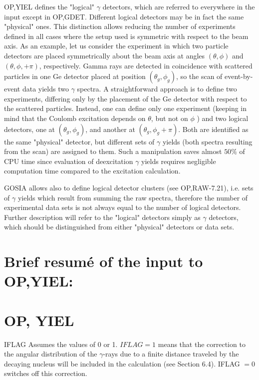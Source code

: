 \documentclass[10pt]{article}
\begin{document}
OP,YIEL defines the "logical" $\gamma$ detectors, which are referred to everywhere in the input except in OP,GDET. Different logical detectors may be in fact the same "physical" ones. This distinction allows reducing the number of experiments defined in all cases where the setup used is symmetric with respect to the beam axis. As an example, let us consider the experiment in which two particle detectors are placed symmetrically about the beam axis at angles $(\theta, \phi)$ and $(\theta, \phi,+\pi)$, respectively. Gamma rays are detected in coincidence with scattered particles in one Ge detector placed at position $\left(\theta_{g}, \phi_{g}\right)$, so the scan of event-by-event data yields two $\gamma$ spectra. A straightforward approach is to define two experiments, differing only by the placement of the Ge detector with respect to the scattered particles. Instead, one can define only one experiment (keeping in mind that the Coulomb excitation depends on $\theta$, but not on $\phi$ ) and two logical detectors, one at $\left(\theta_{g}, \phi_{g}\right)$, and another at $\left(\theta_{g}, \phi_{g}+\pi\right)$. Both are identified as the same "physical" detector, but different sets of $\gamma$ yields (both spectra resulting from the scan) are assigned to them. Such a manipulation saves almost $50 \%$ of CPU time since evaluation of deexcitation $\gamma$ yields requires negligible computation time compared to the excitation calculation.

GOSIA allows also to define logical detector clusters (see OP,RAW-7.21), i.e. sets of $\gamma$ yields which result from summing the raw spectra, therefore the number of experimental data sets is not always equal to the number of logical detectors. Further description will refer to the "logical" detectors simply as $\gamma$ detectors, which should be distinguished from either "physical" detectors or data sets.

\section*{Brief resumé of the input to OP,YIEL:}
\section*{OP, YIEL}
IFLAG Assumes the values of 0 or 1. $I F L A G=1$ means that the correction to the angular distribution of the $\gamma$-rays due to a finite distance traveled by the decaying nucleus will be included in the calculation (see Section 6.4). IFLAG $=0$ switches off this correction.
\end{document}
